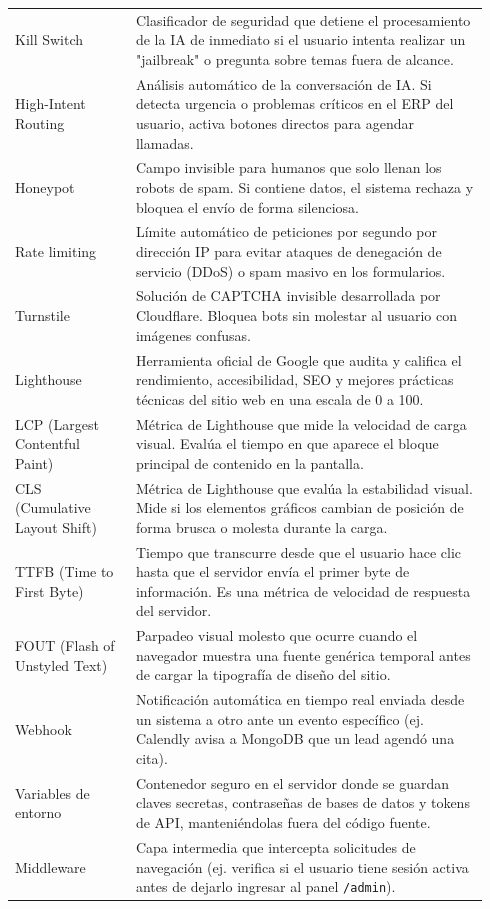 \documentclass[11pt,letterpaper]{article}
\begin{document}
\begin{longtable}{p{0.24\linewidth}p{0.70\linewidth}}
Kill Switch & Clasificador de seguridad que detiene el procesamiento de la IA de inmediato si el usuario intenta realizar un "jailbreak" o pregunta sobre temas fuera de alcance. \\
High-Intent Routing & Análisis automático de la conversación de IA. Si detecta urgencia o problemas críticos en el ERP del usuario, activa botones directos para agendar llamadas. \\
Honeypot & Campo invisible para humanos que solo llenan los robots de spam. Si contiene datos, el sistema rechaza y bloquea el envío de forma silenciosa. \\
Rate limiting & Límite automático de peticiones por segundo por dirección IP para evitar ataques de denegación de servicio (DDoS) o spam masivo en los formularios. \\
Turnstile & Solución de CAPTCHA invisible desarrollada por Cloudflare. Bloquea bots sin molestar al usuario con imágenes confusas. \\
Lighthouse & Herramienta oficial de Google que audita y califica el rendimiento, accesibilidad, SEO y mejores prácticas técnicas del sitio web en una escala de 0 a 100. \\
LCP (Largest Contentful Paint) & Métrica de Lighthouse que mide la velocidad de carga visual. Evalúa el tiempo en que aparece el bloque principal de contenido en la pantalla. \\
CLS (Cumulative Layout Shift) & Métrica de Lighthouse que evalúa la estabilidad visual. Mide si los elementos gráficos cambian de posición de forma brusca o molesta durante la carga. \\
TTFB (Time to First Byte) & Tiempo que transcurre desde que el usuario hace clic hasta que el servidor envía el primer byte de información. Es una métrica de velocidad de respuesta del servidor. \\
FOUT (Flash of Unstyled Text) & Parpadeo visual molesto que ocurre cuando el navegador muestra una fuente genérica temporal antes de cargar la tipografía de diseño del sitio. \\
Webhook & Notificación automática en tiempo real enviada desde un sistema a otro ante un evento específico (ej. Calendly avisa a MongoDB que un lead agendó una cita). \\
Variables de entorno & Contenedor seguro en el servidor donde se guardan claves secretas, contraseñas de bases de datos y tokens de API, manteniéndolas fuera del código fuente. \\
Middleware & Capa intermedia que intercepta solicitudes de navegación (ej. verifica si el usuario tiene sesión activa antes de dejarlo ingresar al panel \texttt{/admin}). \\
\bottomrule
\end{longtable}
\end{document}
